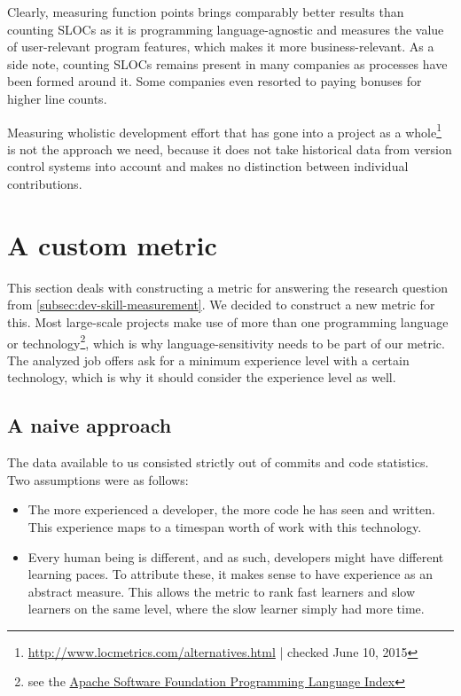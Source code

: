 Clearly, measuring function points brings comparably better results than counting SLOCs as it is programming language-agnostic and measures the value of user-relevant program features, which makes it more business-relevant. As a side note, counting SLOCs remains present in many companies as processes have been formed around it. Some companies even resorted to paying bonuses for higher line counts\cite{am:2009}.
\newline

Measuring wholistic development effort that has gone into a project as a whole\footnote{\url{http://www.locmetrics.com/alternatives.html} | checked June 10, 2015} is not the approach we need, because it does not take historical data from version control systems into account and makes no distinction between individual contributions.

\section{A custom metric}
This section deals with constructing a metric for answering the research question from \ref{subsec:dev-skill-measurement}. We decided to construct a new metric for this. Most large-scale projects make use of more than one programming language or technology\footnote{see \eg the \href{http://projects.apache.org/indexes/language.html}{Apache Software Foundation Programming Language Index}}, which is why language-sensitivity needs to be part of our metric. The analyzed job offers ask for a minimum experience level with a certain technology, which is why it should consider the experience level as well.

\subsection{A naive approach}
The data available to us consisted strictly out of commits and code statistics. Two assumptions were as follows:

\begin{itemize}
 \item The more experienced a developer, the more code he has seen and written. This experience maps to a timespan worth of work with this technology.
 \item Every human being is different, and as such, developers might have different learning paces. To attribute these, it makes sense to have experience as an abstract measure. This allows the metric to rank fast learners and slow learners on the same level, where the slow learner simply had more time.
\end{itemize}

